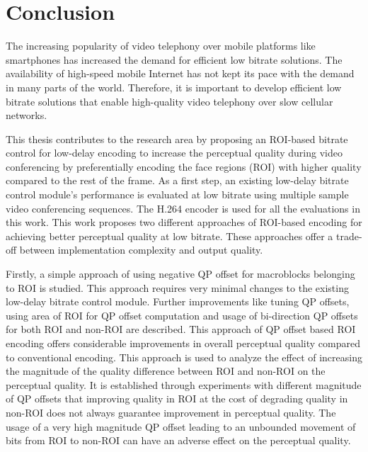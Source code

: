 \chapter{Conclusion} \label{chapter:conclusion}
\thispagestyle{empty}%

The increasing popularity of video telephony over mobile platforms like smartphones has increased the demand for efficient low bitrate solutions. The availability of high-speed mobile Internet has not kept its pace with the demand in many parts of the world. Therefore, it is important to develop efficient low bitrate solutions that enable high-quality video telephony over slow cellular networks. 

This thesis contributes to the research area by proposing an ROI-based bitrate control for low-delay encoding to increase the perceptual quality during video conferencing by preferentially encoding the face regions (ROI) with higher quality compared to the rest of the frame. As a first step, an existing low-delay bitrate control module's performance is evaluated at low bitrate using multiple sample video conferencing sequences. The H.264 encoder is used for all the evaluations in this work. This work proposes two different approaches of ROI-based encoding for achieving better perceptual quality at low bitrate. These approaches offer a trade-off between implementation complexity and output quality. 

Firstly, a simple approach of using negative QP offset for macroblocks belonging to ROI is studied. This approach requires very minimal changes to the existing low-delay bitrate control module. Further improvements like tuning QP offsets, using area of ROI for QP offset computation and usage of bi-direction QP offsets for both ROI and non-ROI are described. This approach of QP offset based ROI encoding offers considerable improvements in overall perceptual quality compared to conventional encoding. This approach is used to analyze the effect of increasing the magnitude of the quality difference between ROI and non-ROI on the perceptual quality. It is established through experiments with different magnitude of QP offsets that improving quality in ROI at the cost of degrading quality in non-ROI does not always guarantee improvement in perceptual quality. The usage of a very high magnitude QP offset leading to an unbounded movement of bits from ROI to non-ROI can have an adverse effect on the perceptual quality.

